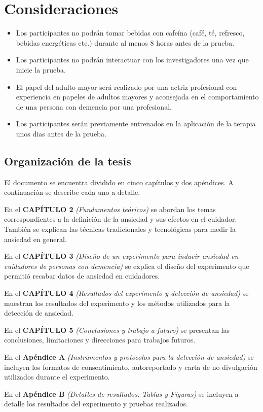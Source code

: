 \section{Consideraciones}
	\begin{itemize}
		\item{Los participantes no podr\'an tomar bebidas con cafe\'ina (caf\'e, t\'e, refresco, bebidas energ\'eticas etc.) durante al menos 8 horas antes de la prueba.}
		\item{Los participantes no podr\'an interactuar con los investigadores una vez que inicie la prueba.}
		\item{El papel del adulto mayor ser\'a realizado por una actriz profesional con experiencia en papeles de adultos mayores y aconsejada en el comportamiento de una persona con demencia por una profesional.}
		\item{Los participantes ser\'an previamente entrenados en la aplicaci\'on de la terapia unos dias antes de la prueba.}
	\end{itemize}


\subsection{Organizaci\'on de la tesis}
	El documento se encuentra dividido en cinco cap\'itulos y dos ap\'endices. A continuaci\'on se describe cada uno a detalle.
	
	En el \textbf{CAP\'ITULO 2} \textit{(Fundamentos te\'oricos)} se abordan los temas correspondientes a la definici\'on de la ansiedad y sus efectos en el cuidador. Tambi\'en se explican las t\'ecnicas tradicionales y tecnol\'ogicas para medir la ansiedad en general.

	En el \textbf{CAP\'ITULO 3} \textit{(Dise\~no de un experimento para inducir ansiedad en cuidadores de personas con demencia)} se explica el dise\~no del experimento que permiti\'o recabar datos de ansiedad en cuidadores.

	En el \textbf{CAP\'ITULO 4} \textit{(Resultados del experimento y detecci\'on de ansiedad)} se muestran los resultados del experimento y los m\'etodos utilizados para la detecci\'on de ansiedad.

	En el \textbf{CAP\'ITULO 5} \textit{(Conclusiones y trabajo a futuro)} se presentan las conclusiones, limitaciones y direcciones para trabajos futuros.

	En el \textbf{Ap\'endice A} \textit{(Instrumentos y protocolos para la detecci\'on de ansiedad)} se incluyen los formatos de consentimiento, autoreportado y carta de no divulgaci\'on utilizados durante el experimento.

	En el \textbf{Ap\'endice B} \textit{(Detalles de resultados: Tablas y Figuras)} se incluyen a detalle los resultados del experimento y pruebas realizados.

\newpage
